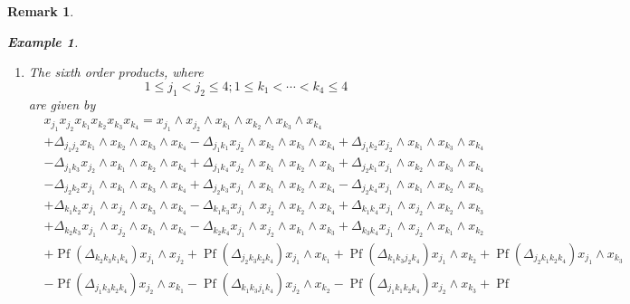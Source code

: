 \documentclass[aps,preprint]{revtex4}%
\newtheorem{example}[theorem]{Example}
\newtheorem{remark}[theorem]{Remark}
\begin{document}
\begin{remark}
\begin{example}
\begin{enumerate}
\item The sixth order products, where
\begin{equation}
1\leq j_{1}<j_{2}\leq4;1\leq k_{1}<\cdots<k_{4}\leq4
\end{equation}
are given by
\begin{align}
&  x_{j_{1}}x_{j_{2}}x_{k_{1}}x_{k_{2}}x_{k_{3}}x_{k_{4}}=x_{j_{1}}\wedge
x_{j_{2}}\wedge x_{k_{1}}\wedge x_{k_{2}}\wedge x_{k_{3}}\wedge x_{k_{4}%
}\nonumber\\
&  +\Delta_{j_{1}j_{2}}x_{k_{1}}\wedge x_{k_{2}}\wedge x_{k_{3}}\wedge
x_{k_{4}}-\Delta_{j_{1}k_{1}}x_{j_{2}}\wedge x_{k_{2}}\wedge x_{k_{3}}\wedge
x_{k_{4}}+\Delta_{j_{1}k_{2}}x_{j_{2}}\wedge x_{k_{1}}\wedge x_{k_{3}}\wedge
x_{k_{4}}\nonumber\\
&  -\Delta_{j_{1}k_{3}}x_{j_{2}}\wedge x_{k_{1}}\wedge x_{k_{2}}\wedge
x_{k_{4}}+\Delta_{j_{1}k_{4}}x_{j_{2}}\wedge x_{k_{1}}\wedge x_{k_{2}}\wedge
x_{k_{3}}+\Delta_{j_{2}k_{1}}x_{j_{1}}\wedge x_{k_{2}}\wedge x_{k_{3}}\wedge
x_{k_{4}}\nonumber\\
&  -\Delta_{j_{2}k_{2}}x_{j_{1}}\wedge x_{k_{1}}\wedge x_{k_{3}}\wedge
x_{k_{4}}+\Delta_{j_{2}k_{3}}x_{j_{1}}\wedge x_{k_{1}}\wedge x_{k_{2}}\wedge
x_{k_{4}}-\Delta_{j_{2}k_{4}}x_{j_{1}}\wedge x_{k_{1}}\wedge x_{k_{2}}\wedge
x_{k_{3}}\nonumber\\
&  +\Delta_{k_{1}k_{2}}x_{j_{1}}\wedge x_{j_{2}}\wedge x_{k_{3}}\wedge
x_{k_{4}}-\Delta_{k_{1}k_{3}}x_{j_{1}}\wedge x_{j_{2}}\wedge x_{k_{2}}\wedge
x_{k_{4}}+\Delta_{k_{1}k_{4}}x_{j_{1}}\wedge x_{j_{2}}\wedge x_{k_{2}}\wedge
x_{k_{3}}\nonumber\\
&  +\Delta_{k_{2}k_{3}}x_{j_{1}}\wedge x_{j_{2}}\wedge x_{k_{1}}\wedge
x_{k_{4}}-\Delta_{k_{2}k_{4}}x_{j_{1}}\wedge x_{j_{2}}\wedge x_{k_{1}}\wedge
x_{k_{3}}+\Delta_{k_{3}k_{4}}x_{j_{1}}\wedge x_{j_{2}}\wedge x_{k_{1}}\wedge
x_{k_{2}}\nonumber\\
&  +\operatorname*{Pf}\left(  \Delta_{k_{2}k_{3}k_{1}k_{4}}\right)  x_{j_{1}%
}\wedge x_{j_{2}}+\operatorname*{Pf}\left(  \Delta_{j_{2}k_{3}k_{2}k_{4}%
}\right)  x_{j_{1}}\wedge x_{k_{1}}+\operatorname*{Pf}\left(  \Delta
_{k_{1}k_{3}j_{2}k_{4}}\right)  x_{j_{1}}\wedge x_{k_{2}}+\operatorname*{Pf}%
\left(  \Delta_{j_{2}k_{1}k_{2}k_{4}}\right)  x_{j_{1}}\wedge x_{k_{3}%
}\nonumber\\
&  -\operatorname*{Pf}\left(  \Delta_{j_{1}k_{3}k_{2}k_{4}}\right)  x_{j_{2}%
}\wedge x_{k_{1}}-\operatorname*{Pf}\left(  \Delta_{k_{1}k_{3}j_{1}k_{4}%
}\right)  x_{j_{2}}\wedge x_{k_{2}}-\operatorname*{Pf}\left(  \Delta
_{j_{1}k_{1}k_{2}k_{4}}\right)  x_{j_{2}}\wedge x_{k_{3}}+\operatorname*{Pf}%

\end{align}
\end{enumerate}
\end{example}
\end{remark}
\end{document}
